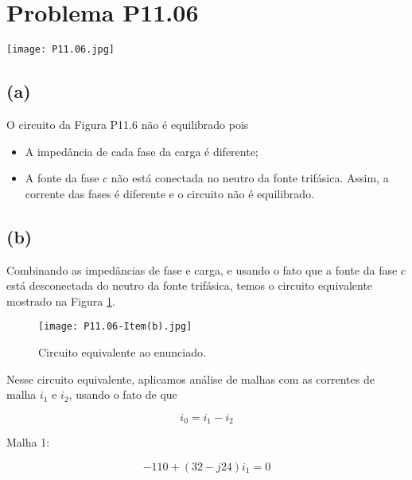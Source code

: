 
\section*{Problema P11.06}

\renewcommand*\thesection{11.06}

\begin{center}
    \texttt{[image: P11.06.jpg]}
\end{center}

\subsection*{(a)}

O circuito da Figura P11.6 não é equilibrado pois  
\begin{itemize}
    \item A impedância de cada fase da carga é diferente;
    \item A fonte da fase $c$ não está conectada no neutro da fonte trifásica. Assim, a corrente das fases é diferente e o circuito não é equilibrado.
\end{itemize}

\subsection*{(b)}

Combinando as impedâncias de fase e carga, e usando o fato que a fonte da fase $c$ está desconectada do neutro da fonte trifásica, 
temos o circuito equivalente mostrado na Figura \ref*{fig:11.06.1}. \\[10pt]

\begin{figure}[!htbp]
    \centering
    \caption{Circuito equivalente ao enunciado.}
      \centering
      \texttt{[image: P11.06-Item(b).jpg]} \\
    \label{fig:11.06.1}
\end{figure}

Nesse circuito equivalente, aplicamos análise de malhas com as correntes de malha $i_1$ e $i_2$, usando o fato de que   

\begin{equation}\label{eq:11.06.1}
    i_0 = i_1 - i_2
\end{equation}

Malha 1:   

\[ -110 + (32 - j24)i_1 = 0 \]

